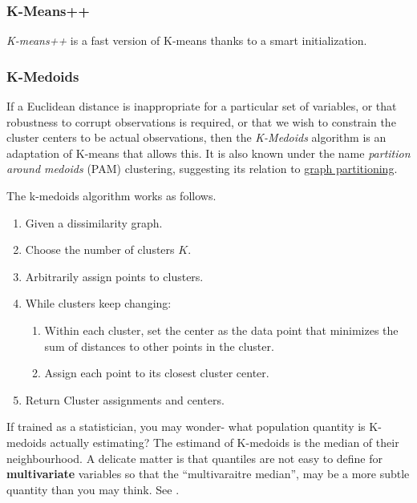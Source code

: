 \documentclass[]{book}
\providecommand{\tightlist}{%
  \setlength{\itemsep}{0pt}\setlength{\parskip}{0pt}}
\theoremstyle{definition}
\theoremstyle{definition}
\theoremstyle{definition}
\theoremstyle{remark}
\let\BeginKnitrBlock\begin \let\EndKnitrBlock\end
\begin{document}
\subsubsection{K-Means++}\label{k-means-1}

\emph{K-means++} is a fast version of K-means thanks to a smart
initialization.

\subsubsection{K-Medoids}\label{k-medoids}

If a Euclidean distance is inappropriate for a particular set of
variables, or that robustness to corrupt observations is required, or
that we wish to constrain the cluster centers to be actual observations,
then the \emph{K-Medoids} algorithm is an adaptation of K-means that
allows this. It is also known under the name \emph{partition around
medoids} (PAM) clustering, suggesting its relation to
\href{https://en.wikipedia.org/wiki/Graph_partition}{graph
partitioning}.

The k-medoids algorithm works as follows.

\begin{enumerate}
\def\labelenumi{\arabic{enumi}.}
\tightlist
\item
  Given a dissimilarity graph.
\item
  Choose the number of clusters \(K\).
\item
  Arbitrarily assign points to clusters.
\item
  While clusters keep changing:

  \begin{enumerate}
  \def\labelenumii{\arabic{enumii}.}
  \tightlist
  \item
    Within each cluster, set the center as the data point that minimizes
    the sum of distances to other points in the cluster.
  \item
    Assign each point to its closest cluster center.
  \end{enumerate}
\item
  Return Cluster assignments and centers.
\end{enumerate}

\BeginKnitrBlock{remark}
{}If trained as a statistician, you may wonder-
what population quantity is K-medoids actually estimating? The estimand
of K-medoids is the median of their neighbourhood. A delicate matter is
that quantiles are not easy to define for \textbf{multivariate}
variables so that the ``multivaraitre median'', may be a more subtle
quantity than you may think. See \citet{small1990survey}.
\EndKnitrBlock{remark}
\end{document}
